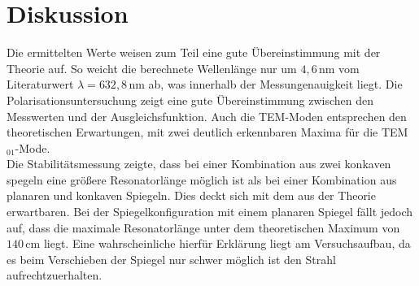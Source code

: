 \section{Diskussion}
Die ermittelten Werte weisen zum Teil eine gute Übereinstimmung mit der Theorie auf. So weicht die berechnete Wellenlänge nur um $4,6\,\si{\nano\meter}$ vom Literaturwert
$\lambda=632,8\,\si{\nano\meter}$ \cite{anleitung} ab, was innerhalb der Messungenauigkeit liegt. Die Polarisationsuntersuchung zeigt eine gute Übereinstimmung zwischen
den Messwerten und der Ausgleichsfunktion. Auch die TEM-Moden entsprechen den theoretischen Erwartungen, mit zwei deutlich erkennbaren Maxima für die TEM$_{01}$-Mode.\\
Die Stabilitätsmessung zeigte, dass bei einer Kombination aus zwei konkaven spegeln eine größere Resonatorlänge möglich ist als bei einer Kombination aus planaren und konkaven Spiegeln.
Dies deckt sich mit dem aus der Theorie erwartbaren. Bei der Spiegelkonfiguration mit einem planaren Spiegel fällt jedoch auf, dass die maximale Resonatorlänge unter dem theoretischen Maximum von $140 \, \si{\centi\meter}$ liegt. Eine
wahrscheinliche hierfür Erklärung liegt am Versuchsaufbau, da es beim Verschieben der Spiegel nur schwer möglich ist den Strahl aufrechtzuerhalten.
